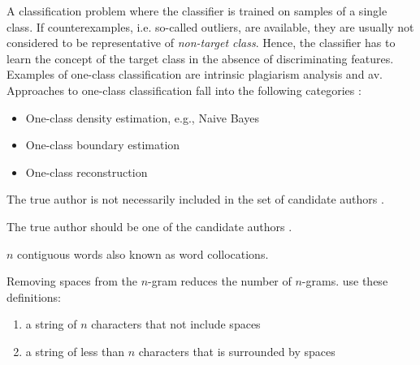 \begin{definition}
    A classification problem where the classifier is trained on samples of a single class.
    If counterexamples, i.e. so-called outliers, are available, they are usually not considered to be representative of \textit{non-target class}.
    Hence, the classifier has to learn the concept of the target class in the absence of discriminating features.
    Examples of one-class classification are intrinsic plagiarism analysis and \ac{av}.
    Approaches to one-class classification fall into the following categories \cite{stein_intrinsic_2011}:
    \begin{itemize}
        \item One-class density estimation, e.g., Naive Bayes
        \item One-class boundary estimation
        \item One-class reconstruction
    \end{itemize}
\end{definition}

\begin{definition}
    The true author is not necessarily included in the set of candidate authors \cite{stamatatos_survey_2009}.
\end{definition}

\begin{definition}
    The true author should be one of the candidate authors \cite{stamatatos_survey_2009,koppel_authorship_2011}.
\end{definition}

\begin{definition}
    [n-gram]
    $n$ contiguous words also known as word collocations.
\end{definition}

\begin{definition}
    Removing spaces from the $n$-gram reduces the number of $n$-grams.
    \citet{koppel_authorship_2011} use these definitions:
    \begin{enumerate}
        \item a string of $n$ characters that not include spaces
        \item a string of less than $n$ characters that is surrounded by spaces
    \end{enumerate}
\end{definition}